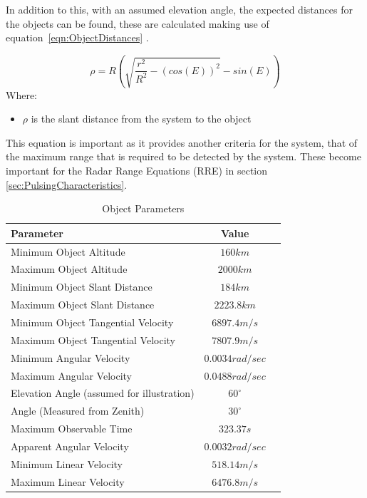 \documentclass[11pt]{witseiepaper}
\begin{document}
In addition to this, with an assumed elevation angle, the expected distances for the objects can be found, these are calculated making use of equation~\ref{eqn:ObjectDistances} \cite{ObservableTime}.


\begin{equation} \label{eqn:ObjectDistances}
    \rho = R (\sqrt{\frac{r^2}{R^2} - (cos(E))^2} - sin(E))
    \end{equation}
Where:
\begin{itemize}
    \item $\rho$ is the slant distance from the system to the object
\end{itemize}
This equation is important as it provides another criteria for the system, that of the maximum range that is required to be detected by the system. These become important for the Radar Range Equations (RRE) in section \ref{sec:PulsingCharacteristics}.


\begin{table}
    \caption{Object Parameters}
    \label{tab:ObjectParameters}
    \begin{center}
        \begin{tabular}{p{70mm}cp{70mm}}
            \hline 
            Parameter & Value \\
            \hline
            Minimum Object Altitude & $160 km$ \\
            Maximum Object Altitude & $2000 km$ \\
            Minimum Object Slant Distance & $184 km$ \\
            Maximum Object Slant Distance & $2223.8 km$ \\            
            Minimum Object Tangential Velocity & $6897.4 m/s$ \\
            Maximum Object Tangential Velocity & $7807.9 m/s$ \\
            Minimum Angular Velocity & $0.0034 rad/sec$ \\
            Maximum Angular Velocity & $0.0488 rad/sec$ \\
            Elevation Angle (assumed for illustration) & $60^{\circ}$ \\
            Angle (Measured from Zenith) & $30^{\circ}$ \\
            Maximum Observable Time & $323.37 s$ \\
            Apparent Angular Velocity & $0.0032 rad/sec$ \\
            Minimum Linear Velocity & $518.14 m/s$ \\
            Maximum Linear Velocity & $6476.8 m/s$ \\
        \end{tabular}
    \end{center}
\end{table}
\end{document}

